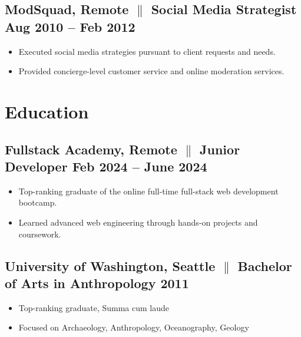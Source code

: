 \documentclass[a4paper,10pt]{article}
\begin{document}
\subsection{ModSquad, Remote {$\parallel$}{ Social Media Strategist} \hfill
      \textbf{Aug 2010 – Feb
            2012}}
\begin{itemize}
\item Executed social media strategies pursuant to client requests and needs.
\item Provided concierge-level customer service and online moderation services.
\end{itemize}

\section{Education}
\subsection{Fullstack Academy, Remote {$\parallel$} {Junior Developer} \hfill
      \textbf{Feb
            2024 – June
            2024}}
\begin{itemize}
      \item Top-ranking graduate of the online full-time full-stack web
            development bootcamp.
      \item Learned advanced web engineering through
            hands-on projects and coursework.
\end{itemize}

\subsection{University of Washington, Seattle {$\parallel$}{ Bachelor of Arts
                  in Anthropology} \hfill
      \textbf{2011}}
\begin{itemize}
      \item Top-ranking graduate, Summa cum laude
      \item Focused on Archaeology, Anthropology, Oceanography, Geology
\end{itemize}
\end{document}
